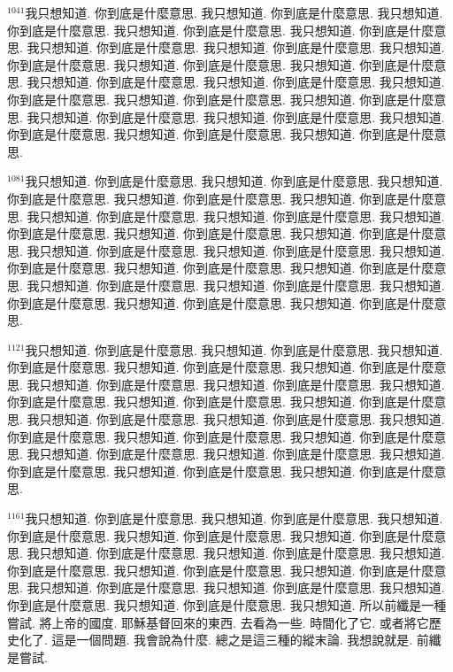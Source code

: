 \documentclass{book}
\begin{document}
$^{1041}$我只想知道.
你到底是什麼意思.
我只想知道.
你到底是什麼意思.
我只想知道.
你到底是什麼意思.
我只想知道.
你到底是什麼意思.
我只想知道.
你到底是什麼意思.
我只想知道.
你到底是什麼意思.
我只想知道.
你到底是什麼意思.
我只想知道.
你到底是什麼意思.
我只想知道.
你到底是什麼意思.
我只想知道.
你到底是什麼意思.
我只想知道.
你到底是什麼意思.
我只想知道.
你到底是什麼意思.
我只想知道.
你到底是什麼意思.
我只想知道.
你到底是什麼意思.
我只想知道.
你到底是什麼意思.
我只想知道.
你到底是什麼意思.
我只想知道.
你到底是什麼意思.
我只想知道.
你到底是什麼意思.
我只想知道.
你到底是什麼意思.
我只想知道.
你到底是什麼意思.

$^{1081}$我只想知道.
你到底是什麼意思.
我只想知道.
你到底是什麼意思.
我只想知道.
你到底是什麼意思.
我只想知道.
你到底是什麼意思.
我只想知道.
你到底是什麼意思.
我只想知道.
你到底是什麼意思.
我只想知道.
你到底是什麼意思.
我只想知道.
你到底是什麼意思.
我只想知道.
你到底是什麼意思.
我只想知道.
你到底是什麼意思.
我只想知道.
你到底是什麼意思.
我只想知道.
你到底是什麼意思.
我只想知道.
你到底是什麼意思.
我只想知道.
你到底是什麼意思.
我只想知道.
你到底是什麼意思.
我只想知道.
你到底是什麼意思.
我只想知道.
你到底是什麼意思.
我只想知道.
你到底是什麼意思.
我只想知道.
你到底是什麼意思.
我只想知道.
你到底是什麼意思.

$^{1121}$我只想知道.
你到底是什麼意思.
我只想知道.
你到底是什麼意思.
我只想知道.
你到底是什麼意思.
我只想知道.
你到底是什麼意思.
我只想知道.
你到底是什麼意思.
我只想知道.
你到底是什麼意思.
我只想知道.
你到底是什麼意思.
我只想知道.
你到底是什麼意思.
我只想知道.
你到底是什麼意思.
我只想知道.
你到底是什麼意思.
我只想知道.
你到底是什麼意思.
我只想知道.
你到底是什麼意思.
我只想知道.
你到底是什麼意思.
我只想知道.
你到底是什麼意思.
我只想知道.
你到底是什麼意思.
我只想知道.
你到底是什麼意思.
我只想知道.
你到底是什麼意思.
我只想知道.
你到底是什麼意思.
我只想知道.
你到底是什麼意思.
我只想知道.
你到底是什麼意思.

$^{1161}$我只想知道.
你到底是什麼意思.
我只想知道.
你到底是什麼意思.
我只想知道.
你到底是什麼意思.
我只想知道.
你到底是什麼意思.
我只想知道.
你到底是什麼意思.
我只想知道.
你到底是什麼意思.
我只想知道.
你到底是什麼意思.
我只想知道.
你到底是什麼意思.
我只想知道.
你到底是什麼意思.
我只想知道.
你到底是什麼意思.
我只想知道.
你到底是什麼意思.
我只想知道.
你到底是什麼意思.
我只想知道.
你到底是什麼意思.
我只想知道.
你到底是什麼意思.
我只想知道.
所以前纖是一種嘗試.
將上帝的國度.
耶穌基督回來的東西.
去看為一些.
時間化了它.
或者將它歷史化了.
這是一個問題.
我會說為什麼.
總之是這三種的縱末論.
我想說就是.
前纖是嘗試.
\end{document}
